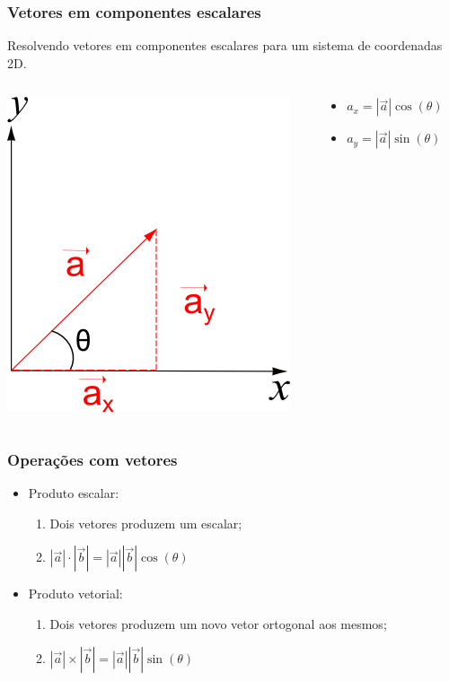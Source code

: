 \begin{frame}
\frametitle{Vetores em componentes escalares}
  \begin{block}{}
    Resolvendo vetores em componentes escalares para um sistema de coordenadas
    2D.
  \end{block}

  \begin{columns}
    \begin{column}{0.5\textwidth}
      \begin{center}
        \includegraphics[scale=0.5]{./figures/vector2scalar.png}
      \end{center}
    \end{column}

    \begin{column}{0.5\textwidth}
      \begin{itemize}
        \item $a_x = |\vec{a}|\cos(\theta)$
        \item $a_y = |\vec{a}|\sin(\theta)$
      \end{itemize}
    \end{column}
  \end{columns}

\end{frame}


\begin{frame}
\frametitle{Operações com vetores}
  \begin{itemize}[<+-| alert@+>]
    \item Produto escalar:
      \begin{enumerate}[<+-| alert@+>]
        \item Dois vetores produzem um escalar;
        \item $|\vec{a}| \cdot |\vec{b}| = |\vec{a}||\vec{b}|\cos(\theta)$
      \end{enumerate}
    \item Produto vetorial:
      \begin{enumerate}[<+-| alert@+>]
        \item Dois vetores produzem um novo vetor ortogonal aos mesmos;
        \item $|\vec{a}| \times |\vec{b}| = |\vec{a}||\vec{b}|\sin(\theta)$
      \end{enumerate}
  \end{itemize}
\end{frame}


